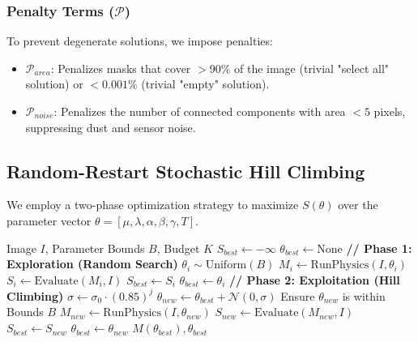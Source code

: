\documentclass[journal]{IEEEtran}
\begin{document}
\subsubsection{Penalty Terms ($\mathcal{P}$)}
To prevent degenerate solutions, we impose penalties:
\begin{itemize}
    \item $\mathcal{P}_{area}$: Penalizes masks that cover $>90\%$ of the image (trivial "select all" solution) or $<0.001\%$ (trivial "empty" solution).
    \item $\mathcal{P}_{noise}$: Penalizes the number of connected components with area $< 5$ pixels, suppressing dust and sensor noise.
\end{itemize}

\subsection{Random-Restart Stochastic Hill Climbing}
We employ a two-phase optimization strategy to maximize $S(\theta)$ over the parameter vector $\theta = [\mu, \lambda, \alpha, \beta, \gamma, T]$.

\begin{algorithm}
\caption{Stochastic Parameter Optimization}
\begin{algorithmic}[1]
\REQUIRE Image $I$, Parameter Bounds $B$, Budget $K$
\STATE $S_{best} \leftarrow -\infty$
\STATE $\theta_{best} \leftarrow \text{None}$
\STATE \textbf{// Phase 1: Exploration (Random Search)}
    \STATE $\theta_i \sim \text{Uniform}(B)$
    \STATE $M_i \leftarrow \text{RunPhysics}(I, \theta_i)$
    \STATE $S_i \leftarrow \text{Evaluate}(M_i, I)$
        \STATE $S_{best} \leftarrow S_i$
        \STATE $\theta_{best} \leftarrow \theta_i$
    \ENDIF
\ENDFOR
\STATE \textbf{// Phase 2: Exploitation (Hill Climbing)}
    \STATE $\sigma \leftarrow \sigma_0 \cdot (0.85)^j$ 
    \STATE $\theta_{new} \leftarrow \theta_{best} + \mathcal{N}(0, \sigma)$
    \STATE Ensure $\theta_{new}$ is within Bounds $B$
    \STATE $M_{new} \leftarrow \text{RunPhysics}(I, \theta_{new})$
    \STATE $S_{new} \leftarrow \text{Evaluate}(M_{new}, I)$
        \STATE $S_{best} \leftarrow S_{new}$
        \STATE $\theta_{best} \leftarrow \theta_{new}$
    \ENDIF
\ENDFOR
\RETURN $M(\theta_{best}), \theta_{best}$
\end{algorithmic}
\end{algorithm}
\end{document}
